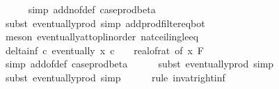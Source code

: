 \begin{isabellebody}
\ \ \ \ \isamarkupfalse%
\ {\isacharparenleft}{\kern0pt}simp\ add{\isacharcolon}{\kern0pt}n{\isacharunderscore}{\kern0pt}of{\isacharunderscore}{\kern0pt}def\ case{\isacharunderscore}{\kern0pt}prod{\isacharunderscore}{\kern0pt}beta{\isacharprime}{\kern0pt}{\isacharparenright}{\kern0pt}\isanewline
\ \ \ \ \isamarkupfalse%
\ {\isacharparenleft}{\kern0pt}subst\ eventually{\isacharunderscore}{\kern0pt}prod{}{\isacharprime}{\kern0pt}{\isacharcomma}{\kern0pt}\ simp\ add{\isacharcolon}{\kern0pt}prod{\isacharunderscore}{\kern0pt}filter{\isacharunderscore}{\kern0pt}eq{\isacharunderscore}{\kern0pt}bot{\isacharparenright}{\kern0pt}\isanewline
\ \ \ \ \isamarkupfalse%
\ {\isacharparenleft}{\kern0pt}meson\ eventually{\isacharunderscore}{\kern0pt}at{\isacharunderscore}{\kern0pt}top{\isacharunderscore}{\kern0pt}linorder\ nat{\isacharunderscore}{\kern0pt}ceiling{\isacharunderscore}{\kern0pt}le{\isacharunderscore}{\kern0pt}eq{\isacharparenright}{\kern0pt}\isanewline
\isanewline
\ \ \isamarkupfalse%
\ delta{\isacharunderscore}{\kern0pt}inf{\isacharcolon}{\kern0pt}\ {\isachardoublequoteopen}{\isasymAnd}c{\isachardot}{\kern0pt}\ eventually\ {\isacharparenleft}{\kern0pt}{\isasymlambda}x{\isachardot}{\kern0pt}\ c\ {\isasymle}\ {}\ {\isacharslash}{\kern0pt}\ {\isacharparenleft}{\kern0pt}real{\isacharunderscore}{\kern0pt}of{\isacharunderscore}{\kern0pt}rat\ {\isacharparenleft}{\kern0pt}{\isasymdelta}{\isacharunderscore}{\kern0pt}of\ x{\isacharparenright}{\kern0pt}{\isacharparenright}{\kern0pt}{\isacharparenright}{\kern0pt}\ {\isacharquery}{\kern0pt}F{\isachardoublequoteclose}\isanewline
\ \ \ \ \isamarkupfalse%
\ {\isacharparenleft}{\kern0pt}simp\ add{\isacharcolon}{\kern0pt}{\isasymdelta}{\isacharunderscore}{\kern0pt}of{\isacharunderscore}{\kern0pt}def\ case{\isacharunderscore}{\kern0pt}prod{\isacharunderscore}{\kern0pt}beta{\isacharprime}{\kern0pt}{\isacharparenright}{\kern0pt}\isanewline
\ \ \ \ \isamarkupfalse%
\ {\isacharparenleft}{\kern0pt}subst\ eventually{\isacharunderscore}{\kern0pt}prod{}{\isacharprime}{\kern0pt}{\isacharcomma}{\kern0pt}\ simp{\isacharparenright}{\kern0pt}\isanewline
\ \ \ \ \isamarkupfalse%
\ {\isacharparenleft}{\kern0pt}subst\ eventually{\isacharunderscore}{\kern0pt}prod{}{\isacharprime}{\kern0pt}{\isacharcomma}{\kern0pt}\ simp{\isacharparenright}{\kern0pt}\isanewline
\ \ \ \ \isamarkupfalse%
\ {\isacharparenleft}{\kern0pt}rule\ inv{\isacharunderscore}{\kern0pt}at{\isacharunderscore}{\kern0pt}right{\isacharunderscore}{\kern0pt}{}{\isacharunderscore}{\kern0pt}inf{\isacharparenright}{\kern0pt}\isanewline

\end{isabellebody}
